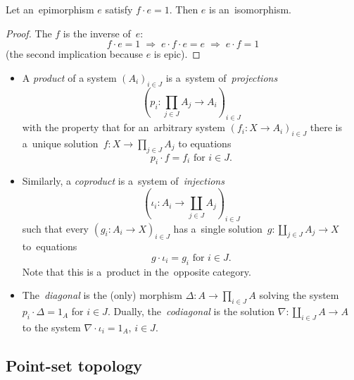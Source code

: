 \begin{lem} \label{lem:epi->iso}
  Let an~epimorphism $e$ satisfy $f \cdot e = 1$.
  Then $e$ is an~isomorphism.
\end{lem}
\begin{proof}
  The $f$ is the inverse of~$e$:
  \[
    f \cdot e = 1 \; \Rightarrow \; e \cdot f \cdot e = e \; \Rightarrow \; e
    \cdot f = 1
  \]
  (the second implication because $e$ is epic).
\end{proof}

\begin{itemize}
\item A \emph{product} of a system $\left(A_i\right)_{i\in J}$ is a~system
of~\emph{projections\/}
\[
  \left(p_i\colon \prod_{j\in J} A_j \to A_i \right)_{i\in J}
\]
with the property that for an~arbitrary system $\left(f_i\colon X \to
A_i\right)_{i\in J}$ there is a~unique solution~$f\colon X \to \prod_{j\in
J} A_j$ to equations
\[
  p_i \cdot f = f_i \text{ for } i\in J.
\]

\item Similarly, a \emph{coproduct} is a~system of~\emph{injections\/}
\[
  \left(\iota_i\colon A_i \to \coprod_{j\in J} A_j \right)_{i\in J}
\]
such that every $\left(g_i\colon A_i \to X \right)_{i\in J}$ has a~single
solution~$g\colon \coprod_{j\in J} A_j \to X$ to~equations
\[
  g \cdot \iota_i = g_i \text{ for } i\in J.
\]
Note that this is a~product in the~opposite category.

\item The~\emph{diagonal} is the (only) morphism $\Delta\colon A \to \prod_{i\in
J} A$ solving the system $p_i\cdot \Delta = 1_A$ for $i \in J$.
Dually, the~\emph{codiagonal} is the solution $\nabla\colon \coprod_{i\in J} A
\to A$ to the system $\nabla\cdot \iota_i = 1_A, \, i \in J$.
\end{itemize}


\subsection*{Point-set topology}

